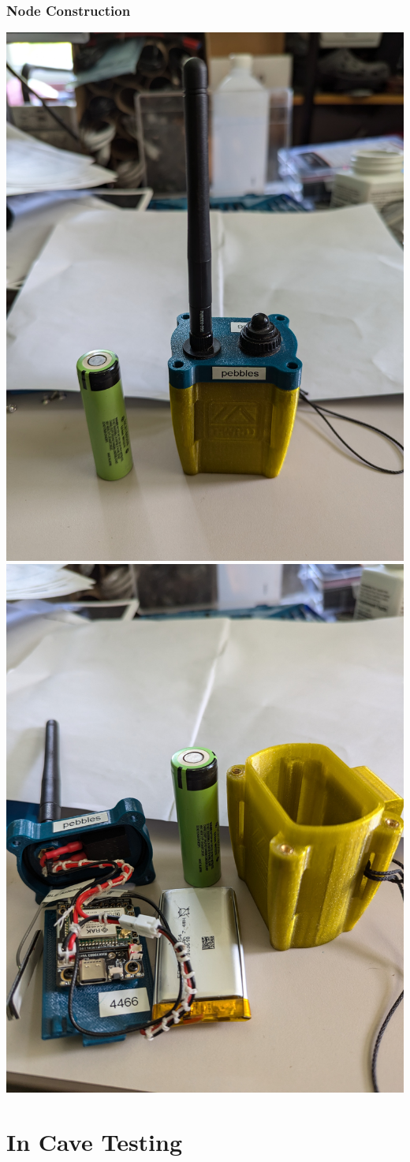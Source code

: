 \documentclass{beamer}
\begin{document}
\begin{frame}
\frametitle{Node Construction}

\begin{center}
\includegraphics[width=.47\textwidth]{../images/PXL_20240621_162728283.jpg}\hfill
\includegraphics[width=.47\textwidth]{../images/PXL_20240621_162803934.jpg}
\end{center}

\end{frame}

\section{In Cave Testing}
\end{document}
